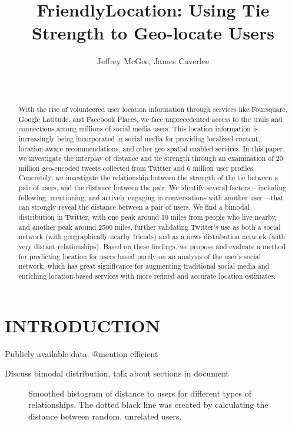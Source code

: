 \documentclass{sig-alternate}
\title{FriendlyLocation: Using Tie Strength to Geo-locate Users
}
\author{
    \alignauthor Jeffrey McGee, James Caverlee\\
    \affaddr{Department of Computer Science and Engineering, Texas A\&M
    University} \\
    \affaddr{ College Station, TX 77845 USA} \\
    \email{jeffamcgee@tamu.edu, caverlee@cse.tamu.edu}
}
\begin{document}
\maketitle
\begin{abstract}
With the rise of volunteered user location information through services like
Foursquare, Google Latitude, and Facebook Places, we face unprecedented access
to the trails and connections among millions of social media users. This
location information is increasingly being incorporated in social media for
providing localized content, location-aware recommendations, and other
geo-spatial enabled services. In this paper, we investigate the interplay of
distance and tie strength through an examination of 20 million geo-encoded
tweets collected from Twitter and 6 million user profiles. Concretely, we
investigate the relationship between the strength of the tie between a pair of
users, and the distance between the pair. We identify several factors --
including following, mentioning, and actively engaging in conversations with
another user -- that can strongly reveal the distance between a pair of users.
We find a bimodal distribution in Twitter, with one peak around 10 miles from
people who live nearby, and another peak around 2500 miles, further validating
Twitter's use as both a social network (with geographically nearby friends) and
as a news distribution network (with very distant relationships). Based on
these findings, we propose and evaluate a method for predicting location for
users based purely on an analysis of the user's social network, which has great
significance for augmenting traditional social media and enriching
location-based services with more refined and accurate location estimates.

\end{abstract}




\section{INTRODUCTION}



Publicly available data.
@mention
efficient


Discuss bimodal distribution.
talk about sections in document

\begin{figure}
\centering
{}
\caption{
Smoothed histogram of distance to users for different types of relationships.
The dotted black line was created by calculating the distance between random, unrelated users.
}
\label{fig:EdgeTypes}
\end{figure}
\end{document}
